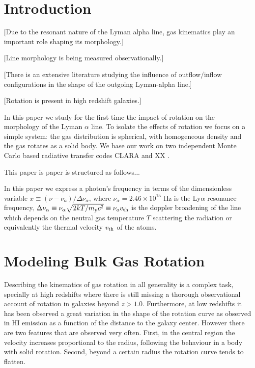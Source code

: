\documentclass[usenatbib]{mn2e}
\begin{document}
\section{Introduction}
\label{sec:intro}



[Due to the resonant nature of the Lyman alpha line, gas kinematics
play an important role shaping its morphology.]


[Line morphology is being measured observationally.]


[There is an extensive literature studying the influence of
outflow/inflow configurations in the shape of the outgoing Lyman-alpha
line.]


[Rotation is present in high redshift galaxies.]

In this paper we study for the first time the impact of rotation on
the morphology of the Lyman $\alpha$ line. To isolate the effects of
rotation we focus on a simple system: the gas distribution is
spherical, with homogeneous density and the gas rotates as a solid
body. We base our work on two independent Monte Carlo based radiative
transfer codes CLARA \citep{CLARA} and XX \citep{DijkstraKramer}.

 
This paper is paper is structured as follows...

In this paper we express a photon's frequency in terms of the
dimensionless variable $x\equiv (\nu -\nu_a)/\Delta\nu_\alpha$, where
$\nu_{\alpha}=2.46\times 10^{15}$ Hz is the Ly$\alpha$ resonance
frequency,  $\Delta\nu_{\alpha} \equiv
\nu_{\alpha}\sqrt{2kT/m_pc^2}\equiv \nu_av_{\rm th} $ is the doppler
broadening of the line which depends on the neutral gas temperature
$T$ scattering the radiation or equivalently the thermal velocity
$v_{\rm th}$ of the atoms. 


\section{Modeling Bulk Gas Rotation}
\label{sec:implementation}

Describing the kinematics of gas rotation in all generality is a
complex task, specially at high redshifts where there is still missing
a thorough observational account of rotation in galaxies beyond
$z>1.0$. Furthermore, at low redshifts it has been observed a great
variation in the shape of the rotation curve as observed in HI
emission as a function of the distance to the galaxy center. However
there are two features that are observed very often. First, in the
central region the velocity increases proportional to the radius,
following the behaviour in a body with solid rotation. Second, beyond
a certain radius the rotation curve tends to flatten. 
\end{document}
